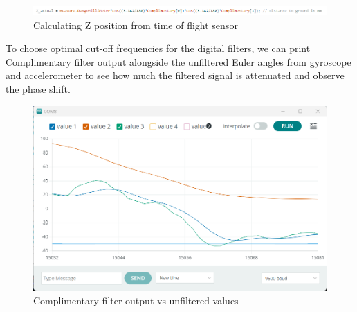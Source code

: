 \begin{figure}[H]
    \begin{center}
    \includegraphics[scale = 0.85]{pictures/IMU/Z_actual_trinagulation.png}
    \end{center}
    \caption{Calculating Z position from time of flight sensor}
    \label{fig:my_label}
\end{figure}



    To choose optimal cut-off frequencies for the digital filters, we can print Complimentary filter output alongside the unfiltered Euler angles from gyroscope and accelerometer to see how much the filtered signal is attenuated and observe the phase shift. 


\begin{figure}[H]
    \begin{center}
    \includegraphics[scale = 0.65]{pictures/IMU/M5.png}
    \end{center}
    \caption{Complimentary filter output vs unfiltered values}
    \label{fig:my_label}
\end{figure}
